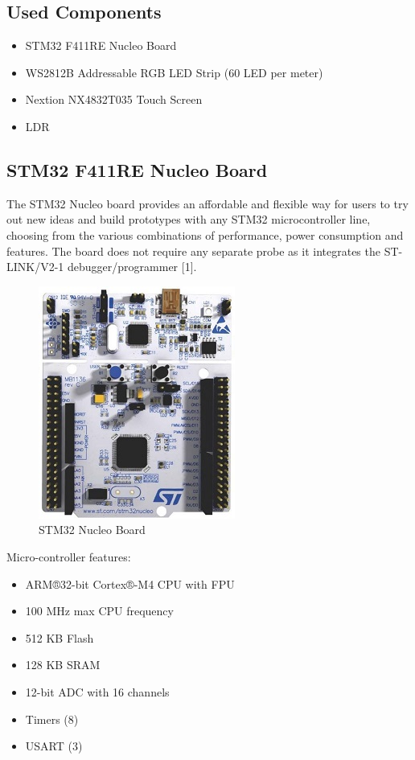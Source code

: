\documentclass[conference]{IEEEtran}
\begin{document}
\subsection{Used Components}
\begin{itemize}
    \item STM32 F411RE Nucleo Board
    \item WS2812B Addressable RGB LED Strip (60 LED per meter)
    \item Nextion NX4832T035 Touch Screen
    \item LDR
\end{itemize}

\subsection{STM32 F411RE Nucleo Board}
The STM32 Nucleo board provides an affordable and flexible way for users to try out new ideas and build prototypes with any STM32 microcontroller line, choosing from the various combinations of performance, power consumption and features. The board does not require any separate probe as it integrates the ST-LINK/V2-1 debugger/programmer [1]. \\

\begin{figure}[htbp]
\centerline{\includegraphics{stm_board.jpg}}
\caption{STM32 Nucleo Board}
\label{fig}
\end{figure}

Micro-controller features:
\begin{itemize}
    \item ARM®32-bit Cortex®-M4 CPU with FPU
    \item 100 MHz max CPU frequency
    \item 512 KB Flash
    \item 128 KB SRAM
    \item 12-bit ADC with 16 channels
    \item Timers (8)
    \item USART (3)
\end{itemize}
\end{document}
